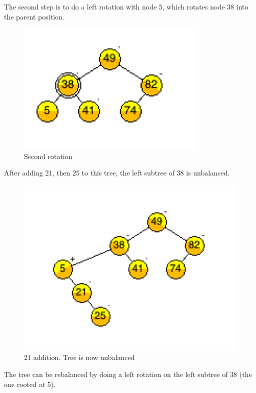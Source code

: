 The second step is to do a left rotation with node 5, which rotates node 38 into the parent position.

\begin{figure}[H]
\centering
\includegraphics{pictures/tree6.png}
\caption{Second rotation}
\label{fig:tree6}
\end{figure}

After adding 21, then 25 to this tree, the left subtree of 38 is unbalanced.

\begin{figure}[H]
\centering
\includegraphics{pictures/tree7.png}
\caption{21 addition. Tree is now unbalanced}
\label{fig:tree7}
\end{figure}

The tree can be rebalanced by doing a left rotation on the left subtree of 38 (the one rooted at 5).

